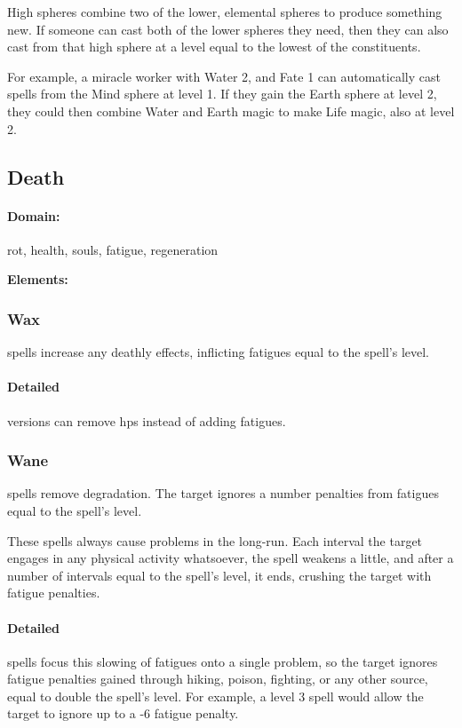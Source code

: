\begin{multicols}{2}

\noindent
High spheres combine two of the lower, elemental spheres to produce something new.
If someone can cast both of the lower spheres they need, then they can also cast from that high sphere at a level equal to the lowest of the constituents.

\begin{exampletext}
  For example, a miracle worker with Water 2, and Fate 1 can automatically cast spells from the Mind sphere at level 1.
  If they gain the Earth sphere at level 2, they could then combine Water and Earth magic to make Life magic, also at level 2.
\end{exampletext}

\subsection{Death}
\paragraph{Domain:}
rot, health, souls, fatigue, regeneration

\textbf{Elements:}

\subsubsection{Wax}
spells increase any deathly effects, inflicting \glspl{fatigue} equal to the spell's level.

\paragraph{Detailed}
versions can remove \glspl{hp} instead of adding \glspl{fatigue}.

\subsubsection{Wane}
spells remove degradation.
The target ignores a number penalties from \glspl{fatigue} equal to the spell's level.

These spells always cause problems in the long-run.
Each interval the target engages in any physical activity whatsoever, the spell weakens a little, and after a number of \glspl{interval} equal to the spell's level, it ends, crushing the target with \gls{fatigue} penalties.

\paragraph{Detailed}
    spells focus this slowing of \glspl{fatigue} onto a single problem, so the target ignores \gls{fatigue} penalties gained through hiking, poison, fighting, or any other source, equal to double the spell's level.
    For example, a level 3 spell would allow the target to ignore up to a -6 \gls{fatigue} penalty.


\end{multicols}
